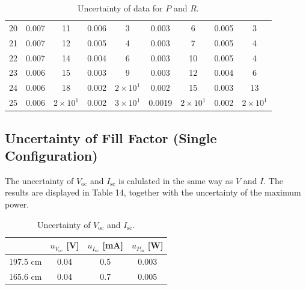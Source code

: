 \documentclass{article}
\begin{document}
{\begin{table}[H]
\begin{tabular}{ccc||cc||cc||cc}
        20 & 0.007                        & 11                             & 0.006                          & 3                            & 0.003     & 6                & 0.005     & 3                \\
        21 & 0.007                        & 12                             & 0.005                          & 4                            & 0.003     & 7                & 0.005     & 4                \\
        22 & 0.007                        & 14                             & 0.004                          & 6                            & 0.003     & 10               & 0.005     & 4                \\
        23 & 0.006                        & 15                             & 0.003                          & 9                            & 0.003     & 12               & 0.004     & 6                \\
        24 & 0.006                        & 18                             & 0.002                          & $2\times10^{1}$              & 0.002     & 15               & 0.003     & 13               \\
        25 & 0.006                        & $2\times10^{1}$                & 0.002                          & $3\times10^{1}$              & 0.0019    & $2\times10^{1}$  & 0.002     & $2\times10^{1}$  \\
        \bottomrule
    \end{tabular}
    \caption{Uncertainty of data for $P$ and $R$.}\label{TableUncPR}
\end{table}

\subsection{Uncertainty of Fill Factor (Single Configuration)}
The uncertainty of $V_\text{oc}$ and $I_\text{sc}$ is calulated in the same way as $V$ and $I$. The results are displayed in Table 14, together with the uncertainty of the maximum power.

\begin{table}[H]\centering
    \begin{tabular}{cccc}
        \toprule
                 & $u_{V_\text{oc}}$ [V] & $u_{I_\text{sc}}$ [mA] & $u_{P_\text{m}}$ [W] \\
        \midrule
        197.5 cm & 0.04                  & 0.5                    & 0.003                \\
        165.6 cm & 0.04                  & 0.7                    & 0.005                \\
        \bottomrule
    \end{tabular}
    \caption{Uncertainty of $V_\text{oc}$ and $I_\text{sc}$.}
    \label{tab:uncocsc}
\end{table}

}
\end{document}
